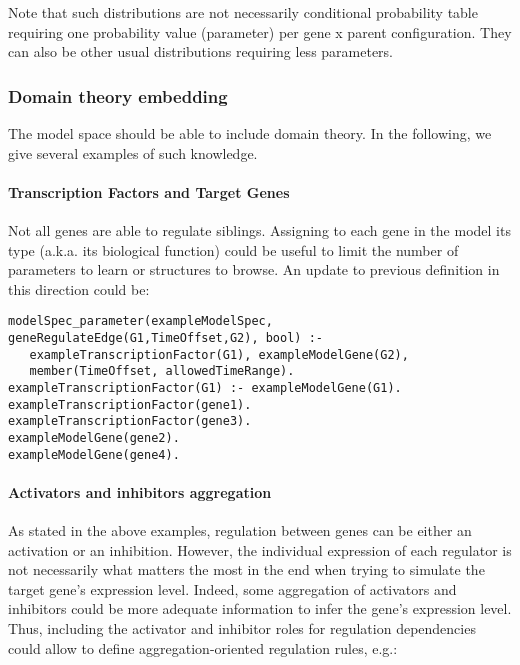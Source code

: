 \documentclass{article}
\begin{document}
Note that such distributions are not necessarily conditional probability table requiring one probability value (parameter) per gene x parent configuration. They can also be other usual distributions requiring less parameters.

\subsubsection{Domain theory embedding}

The model space should be able to include domain theory. In the following, we give several examples of such knowledge.

\paragraph{Transcription Factors and Target Genes}

Not all genes are able to regulate siblings. Assigning to each gene in the model its type (a.k.a. its biological function) could be useful to limit the number of parameters to learn or structures to browse. An update to previous definition in this direction could be:

\begin{verbatim}
modelSpec_parameter(exampleModelSpec, geneRegulateEdge(G1,TimeOffset,G2), bool) :-
   exampleTranscriptionFactor(G1), exampleModelGene(G2), 
   member(TimeOffset, allowedTimeRange).
exampleTranscriptionFactor(G1) :- exampleModelGene(G1).
exampleTranscriptionFactor(gene1).
exampleTranscriptionFactor(gene3).
exampleModelGene(gene2).
exampleModelGene(gene4).
\end{verbatim}

\paragraph{Activators and inhibitors aggregation}

As stated in the above examples, regulation between genes can be either an activation or an inhibition. However, the individual expression of each regulator is not necessarily what matters the most in the end when trying to simulate the target gene's expression level.
Indeed, some aggregation of activators and inhibitors could be more adequate information to infer the gene's expression level. Thus, including the activator and inhibitor roles for regulation dependencies could allow to define aggregation-oriented regulation rules, e.g.:
\end{document}
